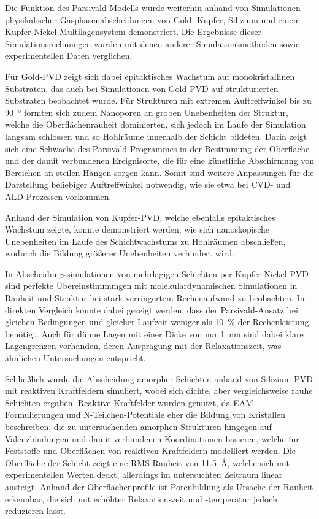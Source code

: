 
Die Funktion des Parsivald-Modells wurde weiterhin anhand von Simulationen physikalischer Gasphasenabscheidungen von Gold, Kupfer, Silizium und einem Kupfer-Nickel-Multi\-lagen\-system demonstriert.
Die Ergebnisse dieser Simulationsrechnungen wurden mit denen anderer Simulationsmethoden sowie experimentellen Daten verglichen.

Für Gold-PVD zeigt sich dabei epitaktisches Wachstum auf monokristallinen Substraten, das auch bei Simulationen von Gold-PVD auf strukturierten Substraten beobachtet wurde.
Für Strukturen mit extremen Auftreffwinkel bis zu \SI{90}{\degree} formten sich zudem Nanoporen an groben Unebenheiten der Struktur, welche die Oberflächenrauheit dominierten, sich jedoch im Laufe der Simulation langsam schlossen und so Hohlräume innerhalb der Schicht bildeten.
Darin zeigt sich eine Schwäche des Parsivald-Programmes in der Bestimmung der Oberfläche und der damit verbundenen Ereignisorte, die für eine künstliche Abschirmung von Bereichen an steilen Hängen sorgen kann.
Somit sind weitere Anpassungen für die Darstellung beliebiger Auftreffwinkel notwendig, wie sie etwa bei CVD- und ALD-Prozessen vorkommen.

Anhand der Simulation von Kupfer-PVD, welche ebenfalls epitaktisches Wachstum zeigte, konnte demonstriert werden, wie sich nanoskopische Unebenheiten im Laufe des Schichtwachstums zu Hohlräumen abschließen, wodurch die Bildung größerer Unebenheiten verhindert wird.

In Abscheidungssimulationen von mehrlagigen Schichten per Kupfer-Nickel-PVD sind perfekte Übereinstimmungen mit molekulardynamischen Simulationen in Rauheit und Struktur bei stark verringertem Rechenaufwand zu beobachten.
Im direkten Vergleich konnte dabei gezeigt werden, dass der Parsivald-Ansatz bei gleichen Bedingungen und gleicher Laufzeit weniger als \SI{10}{\percent} der Rechenleistung benötigt.
Auch für dünne Lagen mit einer Dicke von nur \SI{1}{\nano\meter} sind dabei klare Lagengrenzen vorhanden, deren Ausprägung mit der Relaxationszeit, was ähnlichen Untersuchungen entspricht\cite{zhou_atomistic_1998}.

Schließlich wurde die Abscheidung amorpher Schichten anhand von Silizium-PVD mit reaktiven Kraftfeldern simuliert, wobei sich dichte, aber vergleichsweise rauhe Schichten ergaben.
Reaktive Kraftfelder wurden genutzt, da EAM-Formulierungen und N-Teilchen-Potentiale eher die Bildung von Kristallen beschreiben, die zu untersuchenden amorphen Strukturen hingegen auf Valenzbindungen und damit verbundenen Koordinationen basieren, welche für Feststoffe und Oberflächen von reaktiven Kraftfeldern modelliert werden.
Die Oberfläche der Schicht zeigt eine RMS-Rauheit von \SI{11.5}{\angstrom}, welche sich mit experimentellen Werten deckt, allerdings im untersuchten Zeitraum linear ansteigt.
Anhand der Oberflächenprofile ist Porenbildung als Ursache der Rauheit erkennbar, die sich mit erhöhter Relaxationszeit und -temperatur jedoch reduzieren lässt.

